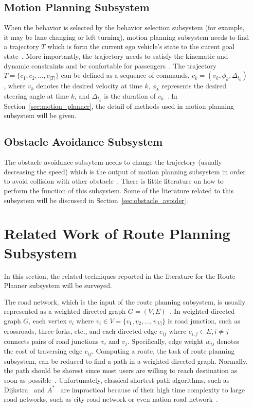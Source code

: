 \documentclass[conference]{IEEEtran}
\begin{document}
\subsection{Motion Planning Subsystem}
When the behavior is selected by the behavior selection subsystem (for example, it may be lane changing or left turning), motion planning subsystem needs to find a trajectory $T$ which is form the current ego vehicle's state to the curent goal state~\cite{Brian2016}. More importantly, the trajectory needs to satisfy the kinematic and dynamic constraints and be confortable for passengers~\cite{self_driving}. The trajectory $T=\{c_1, c_2, ..., c_{|T|}\}$ can be defined as a sequence of commands, $c_k=(v_k, \phi_k, \Delta_{t_k})$, where $v_k$ denotes the desired velocity at time $k$, $\phi_k$ represents the desired steering angle at time $k$, and $\Delta_{t_k}$ is the duration of $c_k$~\cite{self_driving}. In Section~\ref{sec:motion_planner}, the detail of methods used in motion planning subsystem will be given.

\subsection{Obstacle Avoidance Subsystem}
The obstacle avoidance subsytem needs to change the trajectory (usually decreasing the speed) which is the output of motion planning subsystem in order to avoid collision with other obstacle~\cite{self_driving}.  There is little literature on how to perform the function of this subsystem. Some of the literature related to this subsystem will be discussed in Section~\ref{sec:obstacle_avoider}.


\section{Related Work of Route Planning Subsystem}\label{sec:route_planner}
In this section, the related techniques reported in the literature for the Route Planner subsystem will be surveyed.

The road network, which is the input of the route planning subsystem, is usually represented as a weighted directed graph $G=(V, E)$~\cite{self_driving}. In weighted directed graph $G$, each vertex $v_i$ where $v_i \in V=\{v_1, v_2, ..., v_{|V|}\}$ is road junction, such as crossroads, three forks, etc., and each directed edge $e_{ij}$ where $e_{i,j} \in E, i \neq j$ connects pairs of road junctions $v_i$ and $v_j$. Specifically, edge weight $w_{ij}$ denotes the cost of traversing edge $e_{ij}$. Computing a route, the task of route planning subsystem, can be reduced to find a path in a weighted directed graph. Normally, the path should be shorest since most users are willing to reach destination as soon as possible~\cite{self_driving}. Unfortunately, classical shortest path algorithms, such as Dijkstra~\cite{dijkstra1959note} and $A^*$~\cite{Hart1968formal} are impractical because of their high time complexity to large road networks, such as city road network or even nation road network~\cite{self_driving}.
\end{document}
